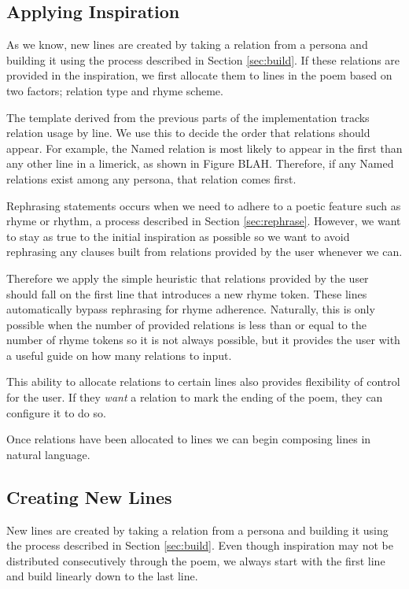 \subsection{Applying Inspiration}
\label{sec:apply-inspr}
As we know, new lines are created by taking a relation from a persona and building it using the process described in Section \ref{sec:build}. If these relations are provided in the inspiration, we first allocate them to lines in the poem based on two factors; relation type and rhyme scheme.

The template derived from the previous parts of the implementation tracks relation usage by line. We use this to decide the order that relations should appear. For example, the Named relation is most likely to appear in the first than any other line in a limerick, as shown in Figure BLAH. Therefore, if any Named relations exist among any persona, that relation comes first.

Rephrasing statements occurs when we need to adhere to a poetic feature such as rhyme or rhythm, a process described in Section \ref{sec:rephrase}. However, we want to stay as true to the initial inspiration as possible so we want to avoid rephrasing any clauses built from relations provided by the user whenever we can.

Therefore we apply the simple heuristic that relations provided by the user should fall on the first line that introduces a new rhyme token. These lines automatically bypass rephrasing for rhyme adherence. Naturally, this is only possible when the number of provided relations is less than or equal to the number of rhyme tokens so it is not always possible, but it provides the user with a useful guide on how many relations to input.

This ability to allocate relations to certain lines also provides flexibility of control for the user. If they \textit{want} a relation to mark the ending of the poem, they can configure it to do so.

Once relations have been allocated to lines we can begin composing lines in natural language.

\subsection{Creating New Lines}
\label{sec:new-lines}
New lines are created by taking a relation from a persona and building it using the process described in Section \ref{sec:build}. Even though inspiration may not be distributed consecutively through the poem, we always start with the first line and build linearly down to the last line.

